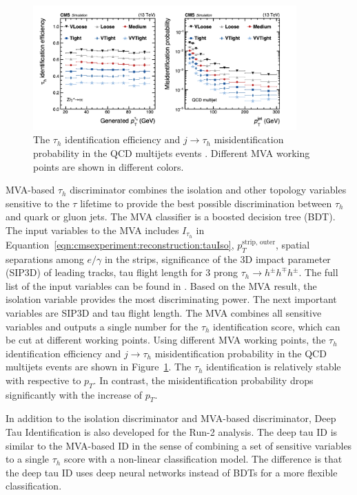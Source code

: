\begin{figure}[ht]
    \centering
    \includegraphics[width=0.9\textwidth]{chapters/CMSExperiment/sectionReconstruction/figures/tauMVA}
    \caption{ The $\tau_h$ identification efficiency and $j\to \tau_h$ misidentification probability in the QCD multijets events \cite{Sirunyan:2018pgf}. Different MVA working points are shown in different colors. }
    \label{fig:cmsexperiment:reconstruction:tauMVA}
\end{figure}



MVA-based $\tau_h$ discriminator combines the isolation and other topology variables sensitive to the $\tau$ lifetime \cite{Sirunyan:2018pgf} to provide the best possible discrimination between $\tau_h$ and quark or gluon jets. The MVA classifier is a boosted decision tree (BDT). The input variables to the MVA includes $I_{\tau_h}$ in Equantion~\ref{eqn:cmsexperiment:reconstruction:tauIso}, $ p_T^{\text{strip, outer}}$, spatial separations among $e/\gamma$ in the strips, significance of the 3D impact parameter (SIP3D) of leading tracks, tau flight length for 3 prong $\tau_h \to h^\pm h^\mp h^\pm$. The full list of the input variables can be found in \cite{Chatrchyan:2012zz, Khachatryan:2015dfa}. Based on the MVA result, the isolation variable provides the most discriminating power. The next important variables are SIP3D and tau flight length. The MVA combines all sensitive variables and outputs a single number for the $\tau_h$ identification score, which can be cut at different working points. Using different MVA working points, the $\tau_h$ identification efficiency and $j\to \tau_h$ misidentification probability in the QCD multijets events are shown in Figure~\ref{fig:cmsexperiment:reconstruction:tauMVA}. The $\tau_h$ identification is relatively stable with respective to $p_T$. In contrast, the misidentification probability drops significantly with the increase of $p_T$. 

In addition to the isolation discriminator and MVA-based discriminator, Deep Tau Identification is also developed for the Run-2 analysis. The deep tau ID is similar to the MVA-based ID in the sense of combining a set of sensitive variables to a single $\tau_h$ score with a non-linear classification model. The difference is that the deep tau ID uses deep neural networks instead of BDTs for a more flexible classification. 





